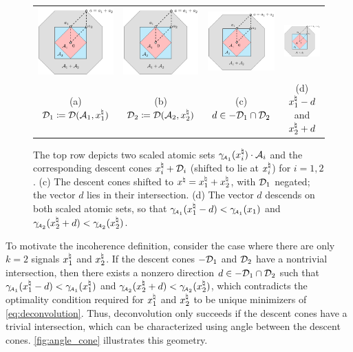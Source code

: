 \begin{figure}[t]
    \centering
    \begin{tabular}{@{}cccc@{}}
      \includegraphics[width=.22\textwidth, page=3]{./figures/illustrations2}
    & \includegraphics[width=.22\textwidth, page=4]{./figures/illustrations2}
    & \includegraphics[width=.22\textwidth, page=5]{./figures/illustrations2}
    & \includegraphics[width=.22\textwidth, page=6]{./figures/illustrations2}
  \\ (a) \small $\mathcal{D}_1\coloneqq\mathcal{D}(\mathcal{A}_1, x_1^{\natural})$ & (b) \small  $\mathcal{D}_2\coloneqq\mathcal{D}(\mathcal{A}_2, x_2^{\natural})$ & (c) \small $d \in -\mathcal{D}_1\cap\mathcal{D}_2$ & (d) \small $x_1^{\natural} - d$ and $x_2^{\natural} + d$ 
    \end{tabular}
    \caption{The top row depicts two scaled atomic sets $\gamma_{\!\scriptscriptstyle\mathcal{A}_1}(x_i^{\natural})\cdot\mathcal{A}_i$ and the corresponding descent cones $x_i^{\natural} + \mathcal{D}_i$ (shifted to lie at $x_i^{\natural}$) for $i=1,2$. (c) The descent cones shifted to $x^{\natural} = x_1^{\natural} + x_2^{\natural}$, with $\mathcal{D}_1$ negated; the vector $d$ lies in their intersection. (d) The vector $d$ descends on both scaled atomic sets, so that $\gamma_{\!\scriptscriptstyle\mathcal{A}_1}(x_1^{\natural} - d) < \gamma_{\!\scriptscriptstyle\mathcal{A}_1}(x_1)$ and $\gamma_{\!\scriptscriptstyle\mathcal{A}_2}(x_2^{\natural} + d) < \gamma_{\!\scriptscriptstyle\mathcal{A}_2}(x_2^{\natural})$.}
    \label{fig:angle_cone}
\end{figure}

To motivate the incoherence definition, consider the case where there are only $k=2$ signals $x_1^{\natural}$ and $x_2^{\natural}$. If the descent cones $-\mathcal{D}_1$ and $\mathcal{D}_2$ have a nontrivial intersection, then there exists a nonzero direction $d \in -\mathcal{D}_1 \cap \mathcal{D}_2$ such that $\gamma_{\!\scriptscriptstyle\mathcal{A}_1}(x_1^{\natural} - d)<\gamma_{\!\scriptscriptstyle\mathcal{A}_1}(x_1^{\natural})$ and $\gamma_{\!\scriptscriptstyle\mathcal{A}_2}(x_2^{\natural} + d)<\gamma_{\!\scriptscriptstyle\mathcal{A}_2}(x_2^{\natural})$, which contradicts the optimality condition required for $x_1^{\natural}$ and $x_2^{\natural}$ to be unique minimizers of \eqref{eq:deconvolution}.  Thus, deconvolution only succeeds if the descent cones have a trivial intersection, which can be characterized using angle between the descent cones. \autoref{fig:angle_cone} illustrates this geometry. 

